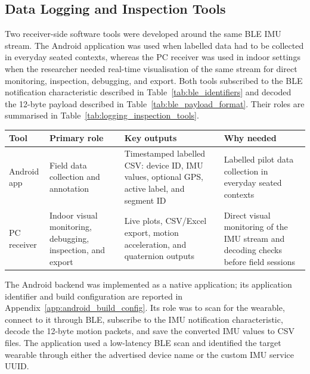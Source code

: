 \subsection{Data Logging and Inspection Tools}\label{sec:data_logging_inspection_tools}

Two receiver-side software tools were developed around the same BLE IMU stream. The Android application was used when labelled data had to be collected in everyday seated contexts, whereas the PC receiver was used in indoor settings when the researcher needed real-time visualisation of the same stream for direct monitoring, inspection, debugging, and export. Both tools subscribed to the BLE notification characteristic described in Table~\ref{tab:ble_identifiers} and decoded the 12-byte payload described in Table~\ref{tab:ble_payload_format}. Their roles are summarised in Table~\ref{tab:logging_inspection_tools}.

\begin{strip}
    \centering
    \small
    \label{tab:logging_inspection_tools}
    \begin{tabularx}{\textwidth}{@{}p{}p{}p{}X@{}}
        \toprule
        Tool & Primary role & Key outputs & Why needed \\
        \midrule
        Android app & Field data collection and annotation & Timestamped labelled CSV: device ID, IMU values, optional GPS, active label, and segment ID & Labelled pilot data collection in everyday seated contexts \\
        PC receiver & Indoor visual monitoring, debugging, inspection, and export & Live plots, CSV/Excel export, motion acceleration, and quaternion outputs & Direct visual monitoring of the IMU stream and decoding checks before field sessions \\
        \bottomrule
    \end{tabularx}
    \vspace{0.6em}
\end{strip}

The Android backend was implemented as a native application; its application identifier and build configuration are reported in Appendix~\ref{app:android_build_config}. Its role was to scan for the wearable, connect to it through BLE, subscribe to the IMU notification characteristic, decode the 12-byte motion packets, and save the converted IMU values to CSV files. The application used a low-latency BLE scan and identified the target wearable through either the advertised device name  or the custom IMU service UUID.

